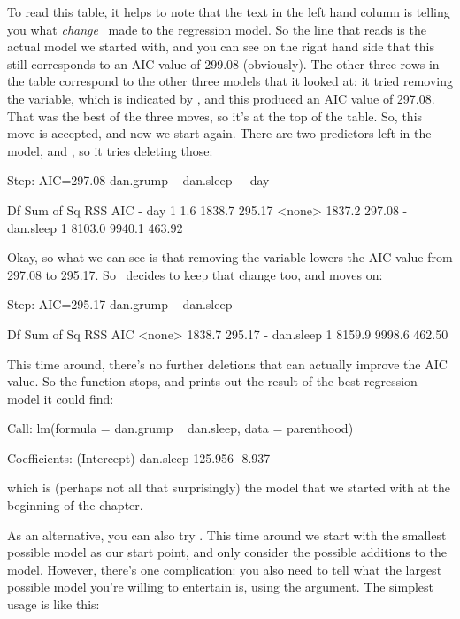 To read this table, it helps to note that the text in the left hand column is telling you what {\it change} \R\ made to the regression model. So the line that reads  is the actual model we started with, and you can see on the right hand side that this still corresponds to an AIC value of 299.08 (obviously). The other three rows in the table correspond to the other three models that it looked at: it tried removing the  variable, which is indicated by , and this produced an AIC value of 297.08. That was the best of the three moves, so it's at the top of the table. So, this move is accepted, and now we start again. There are two predictors left in the model,  and , so it tries deleting those:
\begin{rblock1}
Step:  AIC=297.08
dan.grump ~ dan.sleep + day

            Df Sum of Sq    RSS    AIC
- day        1       1.6 1838.7 295.17
<none>                   1837.2 297.08
- dan.sleep  1    8103.0 9940.1 463.92
\end{rblock1}
Okay, so what we can see is that removing the  variable lowers the AIC value from 297.08 to 295.17. So \R\ decides to keep that change too, and moves on:
\begin{rblock1}
Step:  AIC=295.17
dan.grump ~ dan.sleep

            Df Sum of Sq    RSS    AIC
<none>                   1838.7 295.17
- dan.sleep  1    8159.9 9998.6 462.50
\end{rblock1}
This time around, there's no further deletions that can actually improve the AIC value. So the  function stops, and prints out the result of the best regression model it could find:
\begin{rblock1}
Call:
lm(formula = dan.grump ~ dan.sleep, data = parenthood)

Coefficients:
(Intercept)    dan.sleep  
    125.956       -8.937  
\end{rblock1}
which is (perhaps not all that surprisingly) the  model that we started with at the beginning of the chapter.


As an alternative, you can also try . This time around we start with the smallest possible model as our start point, and only consider the possible additions to the model. However, there's one complication: you also need to tell  what the largest possible model you're willing to entertain is, using the  argument. The simplest usage is like this:

